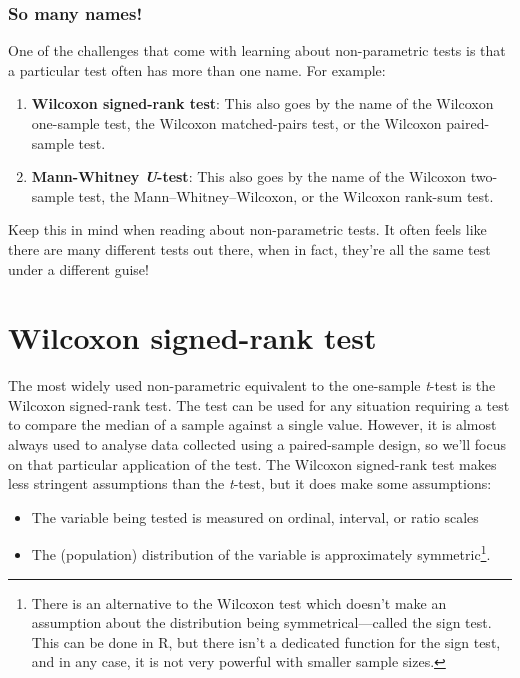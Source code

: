 \documentclass[
]{book}
\providecommand{\tightlist}{%
  \setlength{\itemsep}{0pt}\setlength{\parskip}{0pt}}
\newenvironment{greybox}{
  \definecolor{shadecolor}{rgb}{0.95,0.95,0.95}  %
  \color{black}
  \begin{shaded}}
 {\end{shaded}}
\newenvironment{infobox}[1]
  {
  \begin{itemize}
  \renewcommand{\labelitemi}{
    \raisebox{-.7\height}[0pt][0pt]{
      {\setkeys{Gin}{width=3em,keepaspectratio}
        \texttt{[image: images/\#1]}}
    }
  }
  \setlength{\fboxsep}{1em}
  \begin{greybox}
  \item
  }
  {
  \end{greybox}
  \end{itemize}
  }
\begin{document}
\begin{infobox}{warning}

\hypertarget{so-many-names}{%
\subsubsection*{So many names!}\label{so-many-names}}

One of the challenges that come with learning about non-parametric tests is that a particular test often has more than one name. For example:

\begin{enumerate}
\def\labelenumi{\arabic{enumi})}
\tightlist
\item
  \textbf{Wilcoxon signed-rank test}: This also goes by the name of the Wilcoxon one-sample test, the Wilcoxon matched-pairs test, or the Wilcoxon paired-sample test.
\item
  \textbf{Mann-Whitney \emph{U}-test}: This also goes by the name of the Wilcoxon two-sample test, the Mann--Whitney--Wilcoxon, or the Wilcoxon rank-sum test.
\end{enumerate}

Keep this in mind when reading about non-parametric tests. It often feels like there are many different tests out there, when in fact, they're all the same test under a different guise!

\end{infobox}

\hypertarget{wilcoxon-signed-rank-test}{%
\section{Wilcoxon signed-rank test}\label{wilcoxon-signed-rank-test}}

The most widely used non-parametric equivalent to the one-sample \emph{t}-test is the Wilcoxon signed-rank test. The test can be used for any situation requiring a test to compare the median of a sample against a single value. However, it is almost always used to analyse data collected using a paired-sample design, so we'll focus on that particular application of the test. The Wilcoxon signed-rank test makes less stringent assumptions than the \emph{t}-test, but it does make some assumptions:

\begin{itemize}
\item
  The variable being tested is measured on ordinal, interval, or ratio scales
\item
  The (population) distribution of the variable is approximately symmetric\footnote{There is an alternative to the Wilcoxon test which doesn't make an assumption about the distribution being symmetrical---called the sign test. This can be done in R, but there isn't a dedicated function for the sign test, and in any case, it is not very powerful with smaller sample sizes.}.
\end{itemize}
\end{document}
